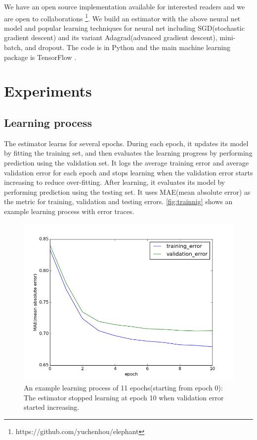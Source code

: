 \documentclass{article}
\begin{document}
We have an open source implementation available for interested readers and we 
are open to collaborations \footnote{https://github.com/yuchenhou/elephant}.
We build an estimator with the above neural net model and popular learning 
techniques for neural net including SGD(stochastic gradient descent) and its 
variant Adagrad(advanced gradient descent), mini-batch, and dropout.
The code is in Python and the main machine learning package is TensorFlow 
\cite{tensorflow2015-whitepaper}.

\section{Experiments}

\subsection{Learning process}
The estimator learns for several epochs.
During each epoch, it updates its model by fitting the training set, and 
then evaluates the learning progress by performing prediction using the 
validation set.
It logs the average training error and average validation error for each epoch 
and stops learning when the validation error starts increasing to reduce 
over-fitting.
After learning, it evaluates its model by performing prediction using the 
testing set.
It uses MAE(mean absolute error) as the metric for training, validation and 
testing errors.
\autoref{fig:trainnig} shows an example learning process with error traces.
\begin{figure}[h]
	\centering
	\includegraphics[width=0.5\linewidth]{training}
	\caption{An example learning process of 11 epochs(starting from epoch 0): 
	The estimator stopped learning at epoch 10 when validation error started 
	increasing.}
	\label{fig:trainnig}
\end{figure}
\end{document}
